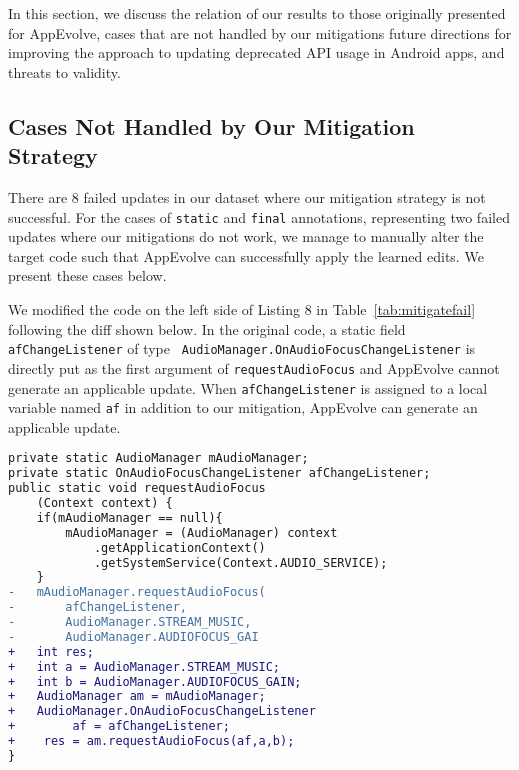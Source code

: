 In this section, we discuss the relation of our
results to those originally presented for AppEvolve, cases that are not
handled by our mitigations future directions for improving the
approach to updating deprecated API usage in Android apps, and threats to validity.

\subsection{Cases Not Handled by Our Mitigation Strategy}

There are 8 failed updates in our dataset where our mitigation
strategy is not successful. For the cases of {\tt static} and {\tt final}
annotations, representing two failed updates where our mitigations do not
work, we manage to manually alter the target code such that AppEvolve can
successfully apply the learned edits. We present these cases below.

We modified the code on the left side of Listing 8 in
Table~\ref{tab:mitigatefail} following the diff shown below. In the
original code, a static field {\tt afChangeListener} of type {\tt
  Audio\-Manager.OnAudioFocusChangeListener} is directly put as the first
argument of {\tt requestAudioFocus} and AppEvolve cannot generate an
applicable update. When {\tt afChangeListener} is assigned to a local
variable named {\tt af} in addition to our mitigation, AppEvolve can
generate an applicable update. 


\begin{lstlisting}[language=diff,numbers=none]
private static AudioManager mAudioManager;
private static OnAudioFocusChangeListener afChangeListener;
public static void requestAudioFocus
    (Context context) {
    if(mAudioManager == null){
        mAudioManager = (AudioManager) context
            .getApplicationContext()
            .getSystemService(Context.AUDIO_SERVICE);
    }
-   mAudioManager.requestAudioFocus(
-       afChangeListener,
-       AudioManager.STREAM_MUSIC,
-       AudioManager.AUDIOFOCUS_GAI
+   int res;
+   int a = AudioManager.STREAM_MUSIC;
+   int b = AudioManager.AUDIOFOCUS_GAIN;
+   AudioManager am = mAudioManager;
+   AudioManager.OnAudioFocusChangeListener
+        af = afChangeListener;
+    res = am.requestAudioFocus(af,a,b);
}
\end{lstlisting}

\vspace{\baselineskip}

